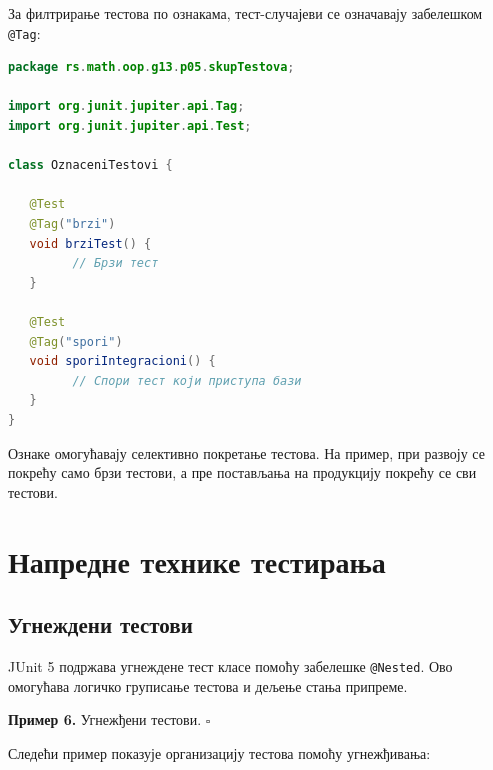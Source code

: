 За филтрирање тестова по ознакама, тест-случајеви се означавају забелешком \texttt{@Tag}:


\begin{lstlisting}[language=Java]
package rs.math.oop.g13.p05.skupTestova;

import org.junit.jupiter.api.Tag;
import org.junit.jupiter.api.Test;
 
class OznaceniTestovi {
 
   @Test
   @Tag("brzi")
   void brziTest() {
         // Брзи тест
   }
 
   @Test
   @Tag("spori")
   void sporiIntegracioni() {
         // Спори тест који приступа бази
   }
}
\end{lstlisting}


Ознаке омогућавају селективно покретање тестова. На пример, при развоју се покрећу само брзи тестови, а пре постављања на продукцију покрећу се сви тестови.


\section{Напредне технике тестирања}

\subsection{Угнеждени тестови}

JUnit 5 подржава угнеждене тест класе помоћу забелешке \texttt{@Nested}. Ово омогућава логичко груписање тестова и дељење стања припреме.


\bigskip

\noindent \textbf{Пример 6.} Угнежђени тестови. $\square$

\medskip

Следећи пример показује организацију тестова помоћу угнежђивања:


